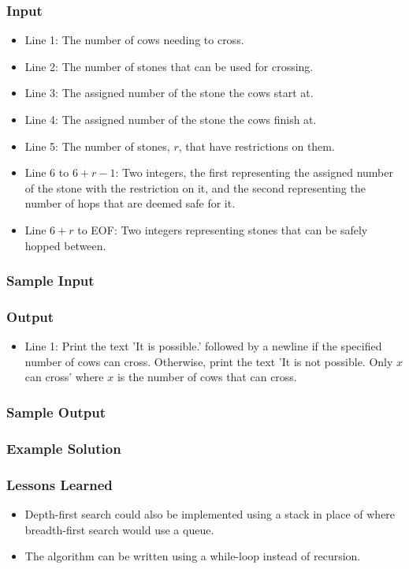 \subsubsection{Input}
\begin{itemize}
	\item Line 1: The number of cows needing to cross.
	\item Line 2: The number of stones that can be used for crossing.
	\item Line 3: The assigned number of the stone the cows start at.
	\item Line 4: The assigned number of the stone the cows finish at.
	\item Line 5: The number of stones, $r$, that have restrictions on them.
	\item Line 6 to $6 + r - 1$: Two integers, the first representing the assigned number of the stone with the restriction on it, and the second representing the number of hops that are deemed safe for it.
	\item Line $6 + r$ to EOF: Two integers representing stones that can be safely hopped between.
\end{itemize}

\subsubsection{Sample Input}

\subsubsection{Output}
\begin{itemize}
	\item Line 1: Print the text 'It is possible.' followed by a newline if the specified number of cows can cross.
		Otherwise, print the text 'It is not possible. Only $x$ can cross' where $x$ is the number of cows that can cross.
\end{itemize}

\subsubsection{Sample Output}

\subsubsection{Example Solution}

\subsubsection{Lessons Learned}
\begin{itemize}
	\item Depth-first search could also be implemented using a stack in place of where breadth-first search would use a queue.
	\item The algorithm can be written using a while-loop instead of recursion.
\end{itemize}
